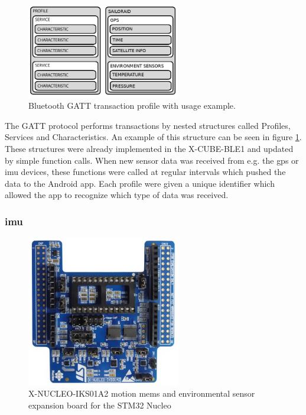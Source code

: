 \begin{figure}[H]
\centering
\includegraphics[width=0.6\textwidth]{Figures/bt_gatt_profile.png}
\caption{Bluetooth GATT transaction profile with usage example.}
\label{bt-gatt-profile}
\end{figure}

The GATT protocol performs transactions by nested structures called Profiles, Services and Characteristics. An example of this structure can be seen in figure \ref{bt-gatt-profile}. These structures were already implemented in the X-CUBE-BLE1 and updated by simple function calls. When new sensor data was received from e.g. the \gls{gps} or \gls{imu} devices, these functions were called at regular intervals which pushed the data to the Android app. Each profile were given a unique identifier which allowed the app to recognize which type of data was received.

\subsubsection{\gls{imu}}

\begin{figure}[H]
\centering
\includegraphics[width=0.6\textwidth]{Figures/x-nucleo-iks01a2.jpg}
\caption{X-NUCLEO-IKS01A2 motion \gls{mems} and environmental sensor expansion board for the STM32 Nucleo}
\label{imu-eval-board}
\end{figure}


